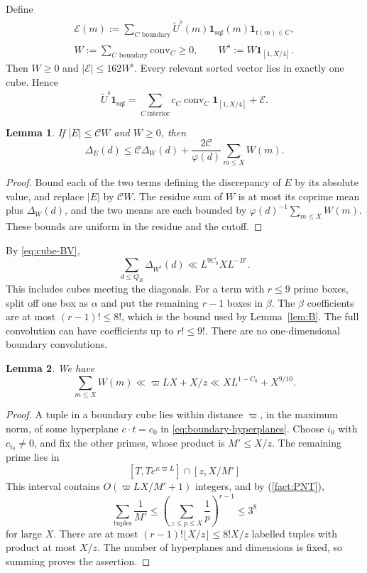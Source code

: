 \documentclass{amsart}
\newtheorem{lemma}{Lemma}[section]
\newcounter{fact}
\numberwithin{equation}{section}
\numberwithin{table}{section}
\newcommand{\ind}{\mathbf 1}
\newcommand{\conv}{\operatorname{conv}}
\begin{document}
Define
\begin{gather*}
\mathcal E(m):=\sum_{C\text{ boundary}}
\widetilde U^\flat(m)\ind_{\mathrm{sqf}}(m)\ind_{t(m)\in C},\\
W:=\sum_{C\text{ boundary}}\mathrm{conv}_C\ge0,
\qquad W^\flat:=W\ind_{[1,X/4]}.
\end{gather*}
Then $W\ge0$ and $|\mathcal E|\le162W^\flat$. Every relevant sorted
vector lies in exactly one cube. Hence
\begin{equation}\label{eq:squarefree-decomposition}
\widetilde U^\flat\ind_{\mathrm{sqf}}
=\sum_{C\ \mathrm{interior}}c_C\conv_C\ind_{[1,X/4]}+\mathcal E.
\end{equation}

\begin{lemma}\label{lem:positive-transfer}
If $|E|\le\mathcal CW$ and $W\ge0$, then
\[
\Delta_{E}(d)
\le\mathcal C\Delta_W(d)
+\frac{2\mathcal C}{\varphi(d)}\sum_{m\le X}W(m).
\]
\end{lemma}

\begin{proof}
Bound each of the two terms defining the discrepancy of $E$ by its
absolute value, and replace $|E|$ by $\mathcal CW$.
The residue sum of $W$ is at most its coprime mean plus $\Delta_W(d)$,
and the two means are each bounded by
$\varphi(d)^{-1}\sum_{m\le X}W(m)$. These bounds are uniform in the
residue and the cutoff.
\end{proof}

By \eqref{eq:cube-BV},
\begin{equation}\label{eq:boundary-BV}
\sum_{d\le Q_B}\Delta_{W^\flat}(d)
\ll L^{9C_0}XL^{-B'}.
\end{equation}
This includes cubes meeting the diagonals. For a term with $r\le9$ prime
boxes, split off one box as $\alpha$ and put the remaining $r-1$ boxes in
$\beta$. The $\beta$ coefficients are at most $(r-1)!\le8!$, which is the
bound used by Lemma~\ref{lem:B}. The full convolution can have coefficients
up to $r!\le9!$. There are no one-dimensional boundary convolutions.

\begin{lemma}\label{lem:boundary-mass}
We have
\[
\sum_{m\le X}W(m)
\ll\varpi LX+X/z
\ll XL^{1-C_0}+X^{9/10}.
\]
\end{lemma}

\begin{proof}
A tuple in a boundary cube lies within distance $\varpi$, in the maximum norm,
of some hyperplane $c\cdot t=c_0$ in \eqref{eq:boundary-hyperplanes}.
Choose $i_0$ with $c_{i_0}\ne0$, and fix the other primes, whose product
is $M'\le X/z$. The remaining prime lies in
\[
[T,Te^{\kappa\varpi L}]\cap[z,X/M']
\]
This interval contains $O(\varpi LX/M'+1)$ integers, and by
(\ref{fact:PNT}),
\[
\sum_{\text{tuples}}\frac1{M'}\le\left(\sum_{z\le p\le X}\frac1p\right)^{r-1}\le3^8
\]
for large $X$.
There are at most $(r-1)!\lfloor X/z\rfloor\le8!X/z$ labelled tuples
with product at most $X/z$. The number of hyperplanes and dimensions is
fixed, so summing proves the assertion.
\end{proof}
\end{document}

